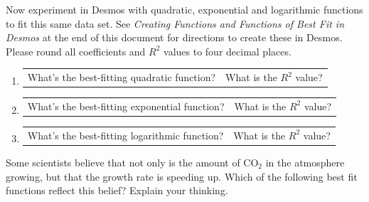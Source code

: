 \documentclass[11pt]{article}
\begin{document}
{\newpage
\item Now  experiment in Desmos with quadratic, exponential and logarithmic functions  to fit this same data set. See {\em Creating Functions and Functions of Best Fit in Desmos} at the end of this document for directions to create these in Desmos. Please round all coefficients and $R^2$ values to four decimal places. \label{qNum}\\
\begin{enumerate}
\item \begin{tabular}{p{4in} l} What's the best-fitting quadratic function? & What is the $R^2$ value?\end{tabular}
\item \begin{tabular}{p{4in} l} What's the best-fitting exponential function? & What is the $R^2$ value?\end{tabular}
\item\begin{tabular}{p{4in} l} What's the best-fitting logarithmic function? & What is the $R^2$ value?\end{tabular}
\end{enumerate} 
 \item Some scientists believe that not only is the amount of CO$_2$ in the atmosphere growing, but that the growth rate is speeding up.  Which of the following best fit functions reflect this belief? Explain your thinking.
 \sol{

}}
\end{document}
